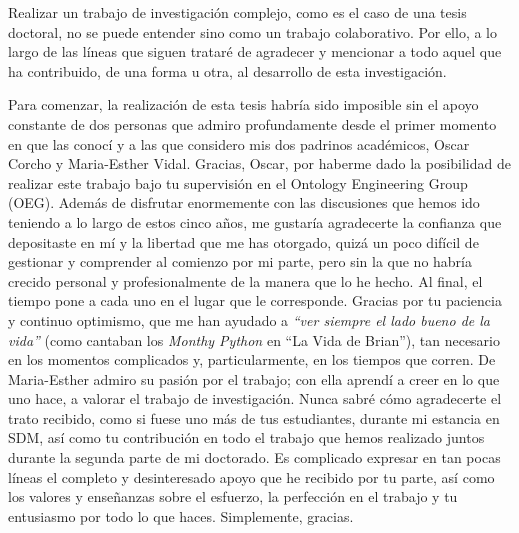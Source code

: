 
\begin{acknowledgementslong} 

Realizar un trabajo de investigación complejo, como es el caso de una tesis doctoral, no se puede entender sino como un trabajo colaborativo. Por ello,  a lo largo de las líneas que siguen trataré de agradecer y mencionar a todo aquel que ha contribuido, de una forma u otra, al desarrollo de esta investigación.

Para comenzar, la realización de esta tesis habría sido imposible sin el apoyo constante de dos personas que admiro profundamente desde el primer momento en que las conocí y a las que considero mis dos padrinos académicos, Oscar Corcho y Maria-Esther Vidal.  Gracias, Oscar, por haberme dado la posibilidad de realizar este trabajo bajo tu supervisión en el Ontology Engineering Group (OEG). Además de disfrutar enormemente con las discusiones que hemos ido teniendo a lo largo de estos cinco años, me gustaría agradecerte la confianza que depositaste en mí y la libertad que me has otorgado, quizá un poco difícil de gestionar y comprender al comienzo por mi parte, pero sin la que  no habría crecido personal y profesionalmente de la manera que lo he hecho. Al final, el tiempo pone a cada uno en el lugar que le corresponde. Gracias por tu paciencia y continuo optimismo, que me han ayudado a \textit{``ver siempre el lado bueno de la vida''} (como cantaban los \textit{Monthy Python} en ``La Vida de Brian''), tan necesario en los momentos complicados y, particularmente, en los tiempos que corren. De Maria-Esther admiro su pasión por el trabajo; con ella aprendí a creer en lo que uno hace,  a valorar el trabajo de investigación. Nunca sabré cómo agradecerte el trato recibido, como si fuese uno más de tus estudiantes, durante mi estancia en SDM, así como tu contribución en todo el trabajo que hemos realizado juntos durante la segunda parte de mi doctorado. Es complicado expresar en tan pocas líneas el completo y desinteresado apoyo que he recibido por tu parte, así como los valores y enseñanzas sobre el esfuerzo, la perfección en el trabajo y tu entusiasmo por todo lo que haces. Simplemente, gracias. 


\end{acknowledgementslong}
